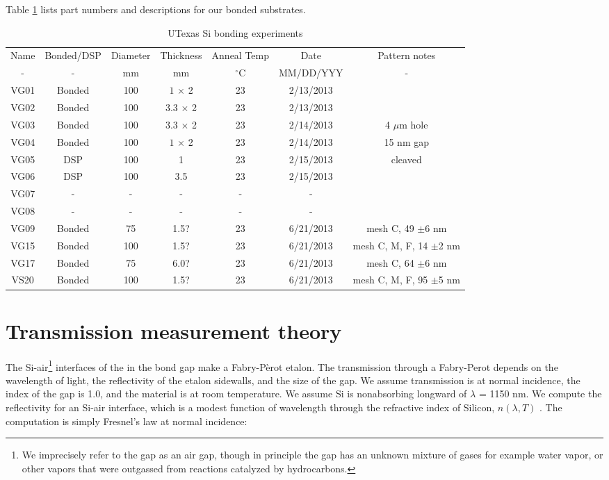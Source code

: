 \documentclass[osajnl,preprint,showpacs,superscriptaddress,12pt]{revtex4-1} %
\begin{document}
Table \ref{tabbondexper} lists part numbers and descriptions for our bonded substrates.

\begin{table}[h!]
\caption{UTexas Si bonding experiments \label{tabbondexper}}
\begin{center}
    \begin{tabular}{ c c c c c c c}
    \hline
    Name & Bonded/DSP & Diameter & Thickness & Anneal Temp & Date & Pattern notes \\ 
    - & - & mm & mm & $^\circ$C & MM/DD/YYY & - \\ 
        \hline
    VG01 & Bonded  & 100  &$1$ $\times$ 2 & 23  & 2/13/2013 &  \\
    VG02 & Bonded & 100 & $3.3$ $\times$ 2 &  23  & 2/13/2013 &  \\
    VG03 & Bonded & 100 & $3.3$ $\times$ 2 &  23 & 2/14/2013 & 4 $\mu$m hole \\    
    VG04 & Bonded & 100 & $1$ $\times$ 2 &  23 & 2/14/2013 & 15 nm gap \\        
    VG05 & DSP & 100 & 1&  23 & 2/15/2013 & cleaved  \\
    VG06 & DSP & 100 & 3.5 &  23 & 2/15/2013 & \\
    VG07 & - & - & - &  - & - & \\
    VG08 & - & - & - &  - & - & \\
    VG09 & Bonded & 75 & 1.5? & 23 & 6/21/2013 & mesh C, 49 $\pm$6 nm \\
    VG15 & Bonded & 100 & 1.5? &  23 & 6/21/2013 & mesh C, M, F, 14 $\pm$2 nm\\
    VG17 & Bonded & 75 & 6.0? &  23 & 6/21/2013 & mesh C, 64 $\pm$6 nm\\
    VS20 & Bonded & 100 & 1.5? &  23 & 6/21/2013 & mesh C, M, F, 95 $\pm$5 nm\\
    \hline
    \end{tabular}
\end{center}
\end{table}

\section{Transmission measurement theory}
The Si-air\footnote{We imprecisely refer to the gap as an air gap, though in principle the gap has an unknown mixture of gases for example water vapor, or other vapors that were outgassed from reactions catalyzed by hydrocarbons.} interfaces of the in the bond gap make a Fabry-P\`erot etalon\cite{2007fuph.book.....S}.  The transmission through a Fabry-Perot depends on the wavelength of light, the reflectivity of the etalon sidewalls, and the size of the gap.  We assume transmission is at normal incidence, the index of the gap is 1.0, and the material is at room temperature.  We assume Si is nonabsorbing longward of $\lambda$ = 1150 nm.  We compute the reflectivity for an Si-air interface, which is a modest function of wavelength through the refractive index of Silicon, $n(\lambda, T)$ \cite{2006SPIE.6273E..77F}.  The computation is simply Fresnel's law at normal incidence:
\end{document}
